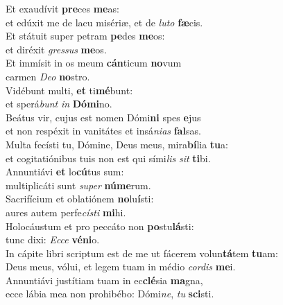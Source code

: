 \evenverse Et exaudívit \textbf{pre}ces \textbf{me}as:~\*\\
\evenverse et edúxit me de lacu misériæ, et de \textit{lu}\textit{to} \textbf{fæ}cis.\\
\oddverse Et státuit super petram \textbf{pe}des \textbf{me}os:~\*\\
\oddverse et diréxit \textit{gres}\textit{sus} \textbf{me}os.\\
\evenverse Et immísit in os meum \textbf{cán}ticum \textbf{no}vum~\*\\
\evenverse carmen \textit{De}\textit{o} \textbf{no}stro.\\
\oddverse Vidébunt multi, \textbf{et} ti\textbf{mé}bunt:~\*\\
\oddverse et sperá\textit{bunt} \textit{in} \textbf{Dó}\textbf{mi}no.\\
\evenverse Beátus vir, cujus est nomen Dómi\textbf{ni} spes \textbf{e}jus~\*\\
\evenverse et non respéxit in vanitátes et insá\textit{ni}\textit{as} \textbf{fal}sas.\\
\oddverse Multa fecísti tu, Dómine, Deus meus, mira\textbf{bí}lia \textbf{tu}a:~\*\\
\oddverse et cogitatiónibus tuis non est qui sími\textit{lis} \textit{sit} \textbf{ti}bi.\\
\evenverse Annuntiávi \textbf{et} lo\textbf{cú}tus sum:~\*\\
\evenverse multiplicáti sunt \textit{su}\textit{per} \textbf{nú}\textbf{me}rum.\\
\oddverse Sacrifícium et oblatiónem \textbf{no}lu\textbf{í}sti:~\*\\
\oddverse aures autem perfe\textit{cí}\textit{sti} \textbf{mi}hi.\\
\evenverse Holocáustum et pro peccáto non \textbf{po}stu\textbf{lá}sti:~\*\\
\evenverse tunc dixi: \textit{Ec}\textit{ce} \textbf{vé}\textbf{ni}o.\\
\oddverse In cápite libri scriptum est de me ut fácerem volun\textbf{tá}tem \textbf{tu}am:~\*\\
\oddverse Deus meus, vólui, et legem tuam in médio \textit{cor}\textit{dis} \textbf{me}i.\\
\evenverse Annuntiávi justítiam tuam in ec\textbf{clé}sia \textbf{ma}gna,~\*\\
\evenverse ecce lábia mea non prohibébo: Dómi\textit{ne}, \textit{tu} \textbf{sci}sti.\\
